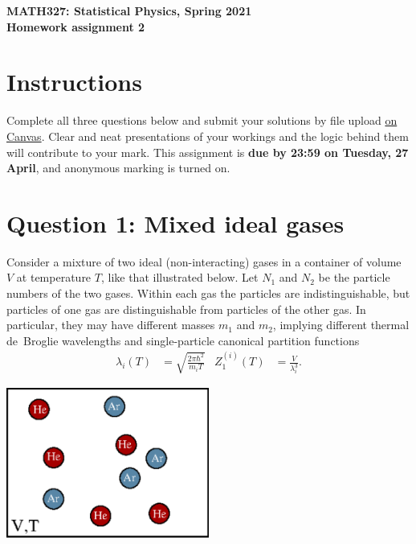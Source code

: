 \documentclass[12 pt]{article} %
\newcommand{\la}{\ensuremath{\lambda} }
\begin{document}
\newcommand{\thisweek}{MATH327 Homework 2}
\newcommand{\moddate}{Last modified 15 Apr.~2021}
\begin{center}
  {\Large \textbf{MATH327: Statistical Physics, Spring 2021}} \\[12 pt]
  {\Large \textbf{Homework assignment 2}} \\[24 pt]
\end{center}

\section*{Instructions}
Complete all three questions below and submit your solutions by file upload \href{https://liverpool.instructure.com/courses/19478/assignments/89669}{on Canvas}.
Clear and neat presentations of your workings and the logic behind them will contribute to your mark.
This assignment is \textbf{due by 23:59 on Tuesday, 27 April}, and anonymous marking is turned on.



\section*{Question 1: Mixed ideal gases}
Consider a mixture of two ideal (non-interacting) gases in a container of volume $V$ at temperature $T$, like that illustrated below.
Let $N_1$ and $N_2$ be the particle numbers of the two gases.
Within each gas the particles are indistinguishable, but particles of one gas are distinguishable from particles of the other gas.
In particular, they may have different masses $m_1$ and $m_2$, implying different thermal de~Broglie wavelengths and single-particle canonical partition functions
\begin{align*}
  \la_i(T) & = \sqrt{\frac{2\pi\hbar^2}{m_i T}} &
  Z_1^{(i)}(T) & = \frac{V}{\la_i^3}.
\end{align*}

\begin{center}\includegraphics[width=0.5\textwidth]{mixing.pdf}\end{center}
\end{document}
